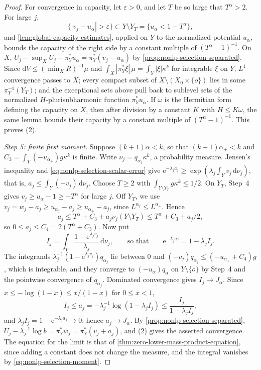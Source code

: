 \begin{proof}
For convergence in capacity, let $\varepsilon>0$, and let $T$ be so large that $T^\alpha>2$. For large $j$,
\[
 \{|v_j-u_\alpha|>\varepsilon\}\subset Y\setminus Y_T=\{u_\alpha<1-T^\alpha\},
\]
and \cref{lem:global-capacity-estimates}, applied on $Y$ to the normalized potential $u_\alpha$, bounds the capacity of the right side by a constant multiple of $(T^\alpha-1)^{-1}$. On $X$, $U_j-\sup_XU_j-\pi_Y^*u_\alpha=\pi_Y^*(v_j-u_\alpha)$ by \cref{prop:nonlp-selection-separated}. Since $\mathrm{d}V\leq(\min_XR)^{-1}\mu$ and $\int_X|\pi_Y^*\xi|\,\mu=\int_Y|\xi|\kappa^k$ for integrable $\xi$ on $Y$, $L^1$ convergence passes to $X$; every compact subset of $X\setminus(X_0\times\{o\})$ lies in some $\pi_Y^{-1}(Y_T)$; and the exceptional sets above pull back to sublevel sets of the normalized $H$-plurisubharmonic function $\pi_Y^*u_\alpha$. If $\omega$ is the Hermitian form defining the capacity on $X$, then after division by a constant $K$ with $H\leq K\omega$, the same lemma bounds their capacity by a constant multiple of $(T^\alpha-1)^{-1}$. This proves (2).

\emph{Step 5: finite first moment.} Suppose $(k+1)\alpha<k$, so that $(k+1)\alpha_+<k$ and $C_3=\int_Y(-u_{\alpha_+})g\kappa^k$ is finite. Write $\nu_j=q_{\alpha_j}\kappa^k$, a probability measure. Jensen's inequality and \eqref{eq:nonlp-selection-scalar-error} give $\mathrm{e}^{-\lambda_ja_j}\geq\exp(\lambda_j\int_Yv_j\,\mathrm{d}\nu_j)$, that is, $a_j\leq\int_Y(-v_j)\,\mathrm{d}\nu_j$. Choose $T\geq2$ with $\int_{Y\setminus Y_T}g\kappa^k\leq1/2$. On $Y_T$, Step~4 gives $v_j\geq u_\alpha-1\geq-T^\alpha$ for large $j$. Off $Y_T$, we use $v_j=w_j-a_j\geq u_{\alpha_j}-a_j\geq u_{\alpha_+}-a_j$, since $L^{\alpha_j}\leq L^{\alpha_+}$. Hence
\[
 a_j\leq T^\alpha+C_3+a_j\nu_j(Y\setminus Y_T)\leq T^\alpha+C_3+a_j/2,
\]
so $0\leq a_j\leq C_4=2(T^\alpha+C_3)$. Now put
\[
 I_j=\int_Y\frac{1-\mathrm{e}^{\lambda_jv_j}}{\lambda_j}\,\mathrm{d}\nu_j,
 \qquad\text{so that}\qquad
 \mathrm{e}^{-\lambda_ja_j}=1-\lambda_jI_j.
\]
The integrands $\lambda_j^{-1}(1-\mathrm{e}^{\lambda_jv_j})q_{\alpha_j}$ lie between $0$ and $(-v_j)q_{\alpha_j}\leq(-u_{\alpha_+}+C_4)g$, which is integrable, and they converge to $(-u_\alpha)q_\alpha$ on $Y\setminus\{o\}$ by Step~4 and the pointwise convergence of $q_{\alpha_j}$. Dominated convergence gives $I_j\to J_\alpha$. Since $x\leq-\log(1-x)\leq x/(1-x)$ for $0\leq x<1$,
\[
 I_j\leq a_j=-\lambda_j^{-1}\log(1-\lambda_jI_j)\leq\frac{I_j}{1-\lambda_jI_j},
\]
and $\lambda_jI_j=1-\mathrm{e}^{-\lambda_ja_j}\to0$; hence $a_j\to J_\alpha$. By \cref{prop:nonlp-selection-separated}, $U_j-\lambda_j^{-1}\log b=\pi_Y^*w_j=\pi_Y^*(v_j+a_j)$, and (2) gives the asserted convergence. The equation for the limit is that of \cref{thm:zero-lower-mass-product-equation}, since adding a constant does not change the measure, and the integral vanishes by \eqref{eq:nonlp-selection-moment}.


\end{proof}
